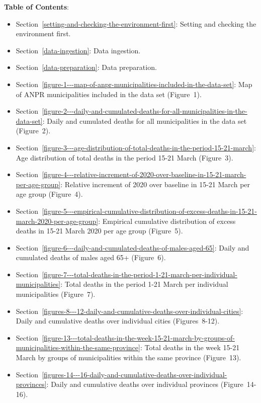 \documentclass[11pt]{article}
\begin{document}
\textbf{Table of Contents}: 
\begin{itemize}
\item Section~\ref{setting-and-checking-the-environment-first}: Setting and checking the environment first.
\item Section~\ref{data-ingestion}: Data ingestion.
\item Section~\ref{data-preparation}: Data preparation.
\item Section~\ref{figure-1---map-of-anpr-municipalities-included-in-the-data-set}: Map of ANPR municipalities included in the data set (Figure~1). 
\item Section~\ref{figure-2---daily-and-cumulated-deaths-for-all-municipalities-in-the-data-set}: Daily and cumulated deaths for all municipalities in the data set  (Figure~2). 
\item Section~\ref{figure-3---age-distribution-of-total-deaths-in-the-period-15-21-march}: Age distribution of total deaths in the period 15-21 March  (Figure~3). 
\item Section~\ref{figure-4---relative-increment-of-2020-over-baseline-in-15-21-march-per-age-group}: Relative increment of 2020 over baseline in 15-21 March per age group  (Figure~4). 
\item Section~\ref{figure-5---empirical-cumulative-distribution-of-excess-deaths-in-15-21-march-2020-per-age-group}: Empirical cumulative distribution of excess deaths in 15-21 March 2020 per age group  (Figure~5). 
\item Section~\ref{figure-6---daily-and-cumulated-deaths-of-males-aged-65}: Daily and cumulated deaths of males aged 65+  (Figure~6). 
\item Section~\ref{figure-7---total-deaths-in-the-period-1-21-march-per-individual-municipalities}: Total deaths in the period 1-21 March per individual municipalities (Figure~7). 
\item Section~\ref{figures-8---12-daily-and-cumulative-deaths-over-individual-cities}: Daily and cumulative deaths over individual cities (Figures~8-12). 
\item Section~\ref{figure-13---total-deaths-in-the-week-15-21-march-by-groups-of-municipalities-within-the-same-province}: Total deaths in the week 15-21 March by groups of municipalities within the same
province  (Figure~13). 
\item Section~\ref{figures-14---16-daily-and-cumulative-deaths-over-individual-provinces}: Daily and cumulative deaths over individual provinces  (Figure~14-16).
\end{itemize}
\end{document}
